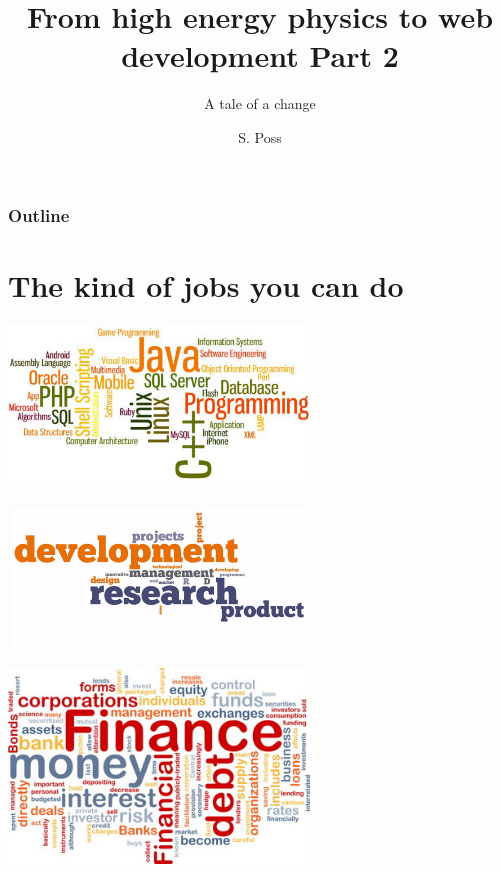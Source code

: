 \documentclass[]{beamer}
\author{S. Poss}
\title{From high energy physics to web development Part 2}
\subtitle{A tale of a change}
\begin{document}
\begin{frame}
\titlepage
\end{frame}

\begin{frame}
\frametitle{Outline}
\tableofcontents
\end{frame}

\section[Jobs]{The kind of jobs you can do}
\begin{frame}
\Huge{\color{blue}{The jobs researchers can do}}
\end{frame}

\begin{frame}
\centering
\includegraphics[width=0.6\textwidth]{cs-cover}

\end{frame}

\begin{frame}
\centering
\includegraphics[width=0.6\textwidth]{ResearchDevelopment}

\end{frame}

\begin{frame}
\centering
\includegraphics[width=0.6\textwidth]{finance}

\end{frame}
\end{document}
